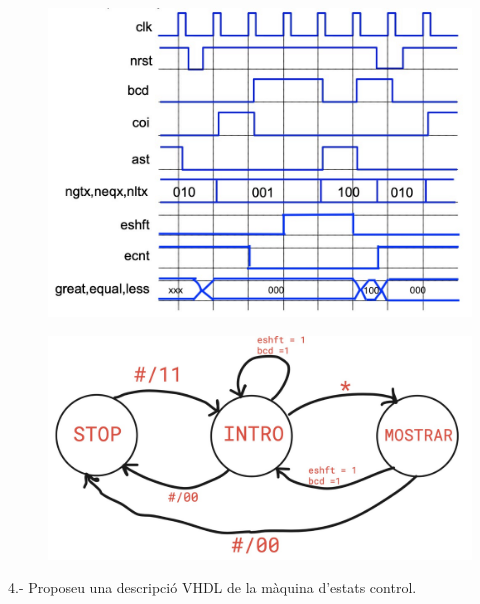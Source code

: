 \documentclass[12pt, a4papre]{article}
\begin{document}
\begin{figure}[H]
		\begin{center}
		\includegraphics[width=130mm]{pregunta3.jpeg}
		\end{center}
	\end{figure}
	
	\begin{figure}[H]
		\begin{center}
		\includegraphics[width=130mm]{diagramadeestats.jpeg}
		\end{center}
	\end{figure}
	
4.- Proposeu una descripció VHDL de la màquina d’estats control.
\end{document}
